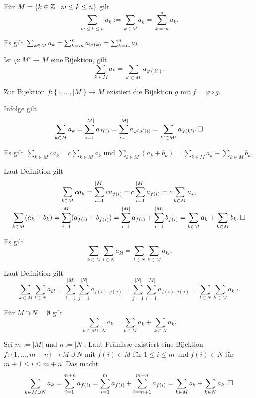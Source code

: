 \begin{Korollar}\label{sum-set-is-range}
Für $M = \{k\in\mathbb Z\mid m\le k\le n\}$ gilt
\[\sum_{m\le k\le n} a_k := \sum_{k\in M} a_k = \sum_{k=m}^n a_k.\]
\end{Korollar}
\begin{Beweis} Es gilt
$\sum_{k\in M} a_k = \sum_{k=m}^n a_{\operatorname{id}(k)} = \sum_{k=m}^n a_k$.\,\qedsymbol
\end{Beweis}

\begin{Korollar}[Substitutionsregel]\label{sum-set-subs}
Ist $\varphi\colon M'\to M$ eine Bijektion, gilt
\[\sum_{k\in M} a_k = \sum_{k'\in M'} a_{\varphi(k')}.\]
\end{Korollar}
\begin{Beweis} Zur Bijektion $f\colon\{1,\ldots,|M|\}\to M$ existiert die Bijektion
$g$ mit $f = \varphi\circ g$.

Infolge gilt
\[\sum_{k\in M} a_k = \sum_{i=1}^{|M|} a_{f(i)}
= \sum_{i=1}^{|M|} a_{\varphi(g(i))}
= \sum_{k'\in M'} a_{\varphi(k')}.\,\square\]
\end{Beweis}

\begin{Korollar} Es gilt
$\sum\limits_{k\in M} ca_k = c\sum\limits_{k\in M} a_k$ und
$\sum\limits_{k\in M} (a_k + b_k)
= \sum\limits_{k\in M} a_k + \sum\limits_{k\in M} b_k$.
\end{Korollar}
\begin{Beweis}
Laut Definition gilt
\begin{gather*}
\sum_{k\in M} ca_k = \sum_{i=1}^{|M|} ca_{f(i)}
= c\sum_{i=1}^{|M|} a_{f(i)} = c\sum_{k\in M} a_k,\\
\sum_{k\in M} (a_k+b_k) = \sum_{i=1}^{|M|} (a_{f(i)}+b_{f(i)}) =
\sum_{i=1}^{|M|} a_{f(i)} + \sum_{i=1}^{|M|} b_{f(i)}
= \sum_{k\in M} a_k + \sum_{k\in M} b_k.\,\square
\end{gather*}
\end{Beweis}

\begin{Korollar} Es gilt
\[\sum_{k\in M}\sum_{l\in N} a_{kl} = \sum_{l\in N}\sum_{k\in M} a_{kl}.\]
\end{Korollar}
\begin{Beweis}
Laut Definition gilt
\[\sum_{k\in M}\sum_{l\in N} a_{kl}
= \sum_{i=1}^{|M|}\sum_{j=1}^{|N|} a_{f(i),g(j)}
= \sum_{j=1}^{|N|}\sum_{i=1}^{|M|} a_{f(i),g(j)}
= \sum_{l\in N}\sum_{k\in M} a_{k,l}.\]
\end{Beweis}

\begin{Korollar}\label{sum-set-disjoint}
Für $M\cap N=\emptyset$ gilt
\[\sum_{k\in M\cup N} a_k = \sum_{k\in M} a_k + \sum_{k\in N} a_k.\]
\end{Korollar}
\begin{Beweis}
Sei $m:=|M|$ und $n:=|N|$. Laut Prämisse existiert eine Bijektion
$f\colon \{1,\ldots, m+n\}\to M\cup N$ mit $f(i)\in M$ für
$1\le i\le m$ und $f(i)\in N$ für $m+1\le i\le m+n$. Das macht
\[\sum_{k\in M\cup N} a_k = \sum_{i=1}^{m+n} a_{f(i)}
= \sum_{i=1}^m a_{f(i)} + \sum_{i=m+1}^{m+n} a_{f(i)}
= \sum_{k\in M} a_k + \sum_{k\in N} a_k.\,\square\]
\end{Beweis}

